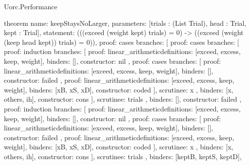 \begin{lexlean}{Uorc.Performance}
\begin{semanticmodule}
theorem{
  name: keepStaysNoLarger,
  parameters: [trials : (List Trial), head : Trial, kept : Trial],
  statement: (((exceed (weight kept) trials) = 0) -> ((exceed (weight (keep head kept)) trials) = 0)),
  proof: cases{
    branches: [
      {
        proof: cases{
          branches: [
            {
              proof: induction{
                branches: [
                  {
                    proof: linear_arithmetic{definitions: [exceed, excess, keep, weight]},
                    binders: [],
                    constructor: nil
                  },
                  {
                    proof: cases{
                      branches: [
                        {
                          proof: linear_arithmetic{definitions: [exceed, excess, keep, weight]},
                          binders: [],
                          constructor: failed
                        },
                        {
                          proof: linear_arithmetic{definitions: [exceed, excess, keep, weight]},
                          binders: [xB, xS, xD],
                          constructor: coded
                        }
                      ],
                      scrutinee: x
                    },
                    binders: [x, others, ih],
                    constructor: cons
                  }
                ],
                scrutinee: trials
              },
              binders: [],
              constructor: failed
            },
            {
              proof: induction{
                branches: [
                  {
                    proof: linear_arithmetic{definitions: [exceed, excess, keep, weight]},
                    binders: [],
                    constructor: nil
                  },
                  {
                    proof: cases{
                      branches: [
                        {
                          proof: linear_arithmetic{definitions: [exceed, excess, keep, weight]},
                          binders: [],
                          constructor: failed
                        },
                        {
                          proof: linear_arithmetic{definitions: [exceed, excess, keep, weight]},
                          binders: [xB, xS, xD],
                          constructor: coded
                        }
                      ],
                      scrutinee: x
                    },
                    binders: [x, others, ih],
                    constructor: cons
                  }
                ],
                scrutinee: trials
              },
              binders: [keptB, keptS, keptD],
}}}}}
\end{semanticmodule}
\end{lexlean}
